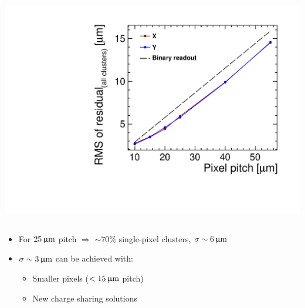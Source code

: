 \begin{frame}
\begin{columns}
    \centering
    \includegraphics[width=\textwidth]{../figures/TestBeam/RMS_extrapolationSmallerPixels.pdf}
  \end{columns}

  \begin{itemize}
  \item For $25\,\upmu\mathrm{m}$ pitch $\Rightarrow$ $\sim70\%$ single-pixel
    clusters, $\sigma\sim6\,\upmu\mathrm{m}$
  \item $\sigma\sim3\,\upmu\mathrm{m}$ can be achieved with:
    \begin{itemize} 
    \item Smaller pixels
      ($<15\,\upmu\mathrm{m}$ pitch)
    \item New charge sharing solutions
    \end{itemize}
  \end{itemize}

\end{frame}


